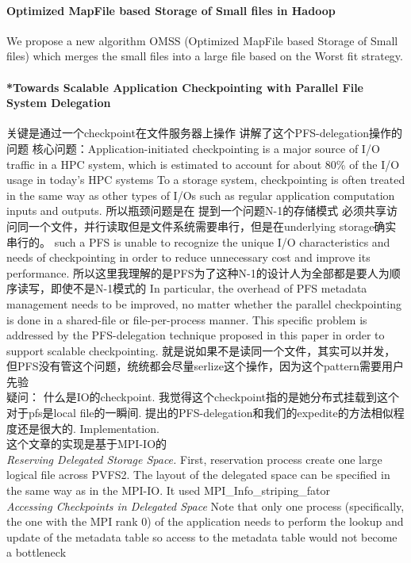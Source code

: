 \documentclass[8pt,UTF8]{article}
\begin{document}
            \paragraph{Optimized MapFile based Storage of Small files in Hadoop}
                We propose a new algorithm OMSS (Optimized MapFile based Storage of Small files) which merges the small files into a large file based on the Worst fit strategy.
            \paragraph{*Towards Scalable Application Checkpointing with Parallel File System Delegation}
                关键是通过一个checkpoint在文件服务器上操作 讲解了这个PFS-delegation操作的问题 核心问题：Application-initiated checkpointing is a major source of I/O traffic in a HPC system, which is estimated to account for about 80\% of the I/O usage in today’s HPC systems To a storage system, checkpointing is often treated in the same way as other types of I/Os such as regular application computation inputs and outputs. 所以瓶颈问题是在 提到一个问题N-1的存储模式 必须共享访问同一个文件，并行读取但是文件系统需要串行，但是在underlying storage确实串行的。  such a PFS is unable to recognize the unique I/O characteristics and needs of checkpointing in order to reduce unnecessary cost and improve its performance.  所以这里我理解的是PFS为了这种N-1的设计人为全部都是要人为顺序读写，即使不是N-1模式的 In particular, the overhead of PFS metadata management needs to be improved, no matter whether the parallel checkpointing is done in a shared-file or file-per-process manner. This specific problem is addressed by the PFS-delegation technique proposed in this paper in order to support scalable checkpointing. 就是说如果不是读同一个文件，其实可以并发，但PFS没有管这个问题，统统都会尽量serlize这个操作，因为这个pattern需要用户先验\\
                疑问： 什么是IO的checkpoint. 我觉得这个checkpoint指的是她分布式挂载到这个对于pfs是local file的一瞬间. 提出的PFS-delegation和我们的expedite的方法相似程度还是很大的. Implementation. \\
                这个文章的实现是基于MPI-IO的 \\
                \emph{Reserving Delegated Storage Space.} First, reservation process create one large logical file across PVFS2. The layout of the delegated space can be specified in the same way as in the MPI-IO. It used MPI\_Info\_striping\_fator \\
                \emph{Accessing Checkpoints in Delegated Space} Note that only one process (specifically, the one with the MPI rank 0) of the application needs to perform the lookup and update of the metadata table so access to the metadata table would not become a bottleneck 
\end{document}
